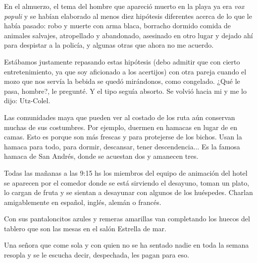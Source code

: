 \documentclass[12pt,twoside,openright,a5paper]{book}
\begin{document}
En el almuerzo, el tema del hombre que apareció muerto en la playa ya era
\emph{vox populi} y se habían elaborado al menos diez hipótesis diferentes
acerca de lo que le había pasado: robo y muerte con arma blaca, borracho
dormido comida de animales salvajes, atropellado y abandonado, asesinado
en otro lugar y dejado ahí para despistar a la policía, y algunas otras
que ahora no me acuerdo.

Estábamos justamente repasando estas hipótesis (debo admitir que con cierto
entretenimiento, ya que soy aficionado a los acertijos) con otra
pareja cuando el mozo que nos servía la bebida se quedó mirándonos,
como congelado. ¿Qué le pasa, hombre?, le pregunté. Y el tipo seguía
absorto. Se volvió hacia mi y me lo dijo: Utz-Colel.


\vspace{0.5cm}
\hrulefill\hspace{0.2cm} \decofourleft\decofourright \hspace{0.2cm} \hrulefill
\vspace{0.5cm}

Las comunidades maya que pueden ver al costado de los ruta aún conservan
muchas de sus costumbres. Por ejemplo, duermen en hamacas en lugar de en
camas. Esto es porque son más frescas y para protejerse de los bichos. Usan la hamaca
para todo, para dormir, descansar, tener descendencia... Es la famosa hamaca de
San Andrés, donde se acuestan dos y amanecen tres.


\vspace{0.5cm}
\hrulefill\hspace{0.2cm} \decofourleft\decofourright \hspace{0.2cm} \hrulefill
\vspace{0.5cm}

Todas las mañanas a las 9:15 hs los miembros del equipo de animación del
hotel se aparecen por el comedor donde se está sirviendo el desayuno, toman
un plato, lo cargan de fruta y se sientan a desayunar con algunos de los
huéspedes. Charlan amigablemente en español, inglés, alemán o francés.

Con sus pantaloncitos azules y remeras amarillas van completando los huecos
del tablero que son las mesas en el salón Estrella de mar.

Una señora que come sola y con quien no se ha sentado nadie en toda la
semana resopla y se le escucha decir, despechada, les pagan para eso.
\end{document}
